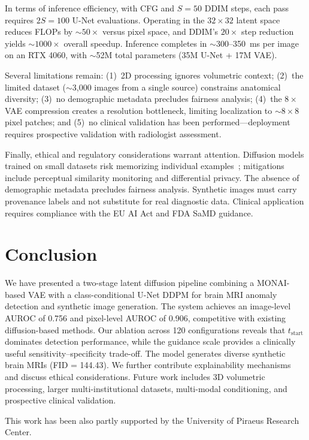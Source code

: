 \documentclass[graybox]{svmult}
\begin{document}
In terms of inference efficiency, with CFG and $S = 50$ DDIM steps, each pass requires $2S = 100$ U-Net evaluations. Operating in the $32 \times 32$ latent space reduces FLOPs by $\sim$$50\times$ versus pixel space, and DDIM's $20\times$ step reduction yields $\sim$$1000\times$ overall speedup. Inference completes in $\sim$300--350~ms per image on an RTX 4060, with $\sim$52M total parameters (35M U-Net + 17M VAE).

Several limitations remain: (1)~2D processing ignores volumetric context; (2)~the limited dataset ($\sim$3,000 images from a single source) constrains anatomical diversity; (3)~no demographic metadata precludes fairness analysis; (4)~the $8\times$ VAE compression creates a resolution bottleneck, limiting localization to $\sim$$8 \times 8$ pixel patches; and (5)~no clinical validation has been performed---deployment requires prospective validation with radiologist assessment.

Finally, ethical and regulatory considerations warrant attention. Diffusion models trained on small datasets risk memorizing individual examples~\cite{akbar2023beware, dar2024investigating}; mitigations include perceptual similarity monitoring and differential privacy. The absence of demographic metadata precludes fairness analysis. Synthetic images must carry provenance labels and not substitute for real diagnostic data. Clinical application requires compliance with the EU AI Act and FDA SaMD guidance.

\section{Conclusion}
\label{sec:conclusion}

We have presented a two-stage latent diffusion pipeline combining a MONAI-based VAE with a class-conditional U-Net DDPM for brain MRI anomaly detection and synthetic image generation. The system achieves an image-level AUROC of 0.756 and pixel-level AUROC of 0.906, competitive with existing diffusion-based methods. Our ablation across 120 configurations reveals that $t_{\text{start}}$ dominates detection performance, while the guidance scale provides a clinically useful sensitivity--specificity trade-off. The model generates diverse synthetic brain MRIs (FID = 144.43). We further contribute explainability mechanisms and discuss ethical considerations. Future work includes 3D volumetric processing, larger multi-institutional datasets, multi-modal conditioning, and prospective clinical validation.

\begin{acknowledgement}
This work has been also partly supported by the University of Piraeus Research Center.
\end{acknowledgement}



\end{document}
